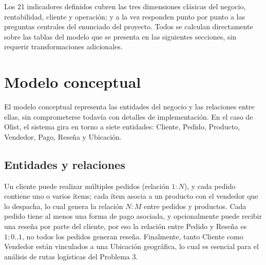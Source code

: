 \documentclass[11pt,a4paper]{article}
\begin{document}
\vspace{0.8em}
Los 21 indicadores definidos cubren las tres dimensiones clásicas del negocio, rentabilidad, cliente y operación; y a la vez responden punto por punto a las preguntas centrales del enunciado del proyecto. Todos se calculan directamente sobre las tablas del modelo que se presenta en las siguientes secciones, sin requerir transformaciones adicionales.

\section{Modelo conceptual}

El modelo conceptual representa las entidades del negocio y las relaciones entre ellas, sin comprometerse todavía con detalles de implementación. En el caso de Olist, el sistema gira en torno a siete entidades: Cliente, Pedido, Producto, Vendedor, Pago, Reseña y Ubicación.

\subsection{Entidades y relaciones}

Un cliente puede realizar múltiples pedidos (relación $1:N$), y cada pedido contiene uno o varios ítems; cada ítem asocia a un producto con el vendedor que lo despacha, lo cual genera la relación $N:M$ entre pedidos y productos. Cada pedido tiene al menos una forma de pago asociada, y opcionalmente puede recibir una reseña por parte del cliente, por eso la relación entre Pedido y Reseña es $1:0..1$, no todos los pedidos generan reseña. Finalmente, tanto Cliente como Vendedor están vinculados a una Ubicación geográfica, lo cual es esencial para el análisis de rutas logísticas del Problema 3.
\end{document}
